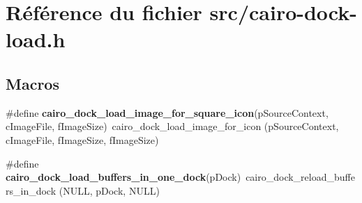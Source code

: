 \section{Référence du fichier src/cairo-dock-load.h}
\label{cairo-dock-load_8h}
\subsection*{Macros}
\begin{CompactItemize}
\item 
\#define {\bf cairo\_\-dock\_\-load\_\-image\_\-for\_\-square\_\-icon}(pSourceContext, cImageFile, fImageSize)~cairo\_\-dock\_\-load\_\-image\_\-for\_\-icon (pSourceContext, cImageFile, fImageSize, fImageSize)
\item 
\#define {\bf cairo\_\-dock\_\-load\_\-buffers\_\-in\_\-one\_\-dock}(pDock)~cairo\_\-dock\_\-reload\_\-buffers\_\-in\_\-dock (NULL, pDock, NULL)
\end{CompactItemize}
